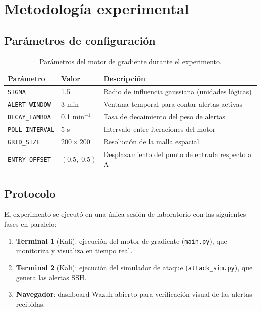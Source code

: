 \documentclass[12pt,a4paper]{article}
\begin{document}
\section{Metodología experimental}

\subsection{Parámetros de configuración}

\begin{table}[H]
  \centering
  \caption{Parámetros del motor de gradiente durante el experimento.}
  \begin{tabular}{@{}lll@{}}
    \toprule
    Parámetro & Valor & Descripción \\
    \midrule
    \texttt{SIGMA}        & 1.5     & Radio de influencia gaussiana (unidades lógicas) \\
    \texttt{ALERT\_WINDOW}& 3 min   & Ventana temporal para contar alertas activas \\
    \texttt{DECAY\_LAMBDA}& 0.1 min$^{-1}$ & Tasa de decaimiento del peso de alertas \\
    \texttt{POLL\_INTERVAL}& 5 s    & Intervalo entre iteraciones del motor \\
    \texttt{GRID\_SIZE}   & $200\times200$ & Resolución de la malla espacial \\
    \texttt{ENTRY\_OFFSET}& $(0.5,\;0.5)$ & Desplazamiento del punto de entrada respecto a A \\
    \bottomrule
  \end{tabular}
\end{table}

\subsection{Protocolo}

El experimento se ejecutó en una única sesión de laboratorio con las
siguientes fases en paralelo:

\begin{enumerate}
  \item \textbf{Terminal 1} (Kali): ejecución del motor de gradiente
    (\texttt{main.py}), que monitoriza y visualiza en tiempo real.
  \item \textbf{Terminal 2} (Kali): ejecución del simulador de ataque
    (\texttt{attack\_sim.py}), que genera las alertas SSH.
  \item \textbf{Navegador}: dashboard Wazuh abierto para verificación
    visual de las alertas recibidas.
\end{enumerate}
\end{document}
